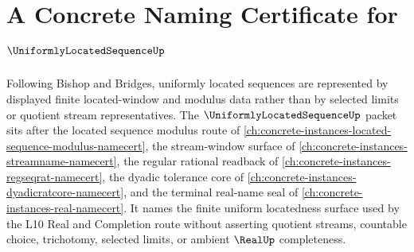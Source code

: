 \chapter{A Concrete Naming Certificate for $\UniformlyLocatedSequenceUp$}
\label{ch:concrete-instances-uniformly-located-sequence-namecert}

Following Bishop and Bridges, uniformly located sequences are represented by displayed finite located-window and modulus data rather than by selected limits or quotient stream representatives. The $\UniformlyLocatedSequenceUp$ packet sits after the located sequence modulus route of \autoref{ch:concrete-instances-located-sequence-modulus-namecert}, the stream-window surface of \autoref{ch:concrete-instances-streamname-namecert}, the regular rational readback of \autoref{ch:concrete-instances-regseqrat-namecert}, the dyadic tolerance core of \autoref{ch:concrete-instances-dyadicratcore-namecert}, and the terminal real-name seal of \autoref{ch:concrete-instances-real-namecert}. It names the finite uniform locatedness surface used by the L10 Real and Completion route without asserting quotient streams, countable choice, trichotomy, selected limits, or ambient $\RealUp$ completeness.

